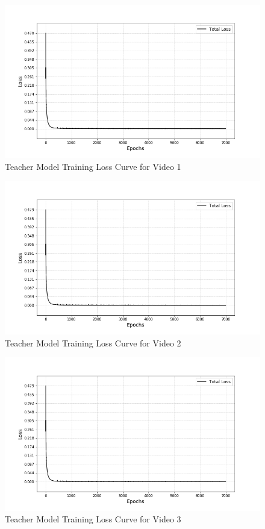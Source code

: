 \documentclass{ioereport}
\begin{document}
\begin{figure}[H]
    \centering
    \includegraphics[height=0.6\linewidth]{assets/audio_video_loss_curves/video1_loss.png}
    \caption{Teacher Model Training Loss Curve for Video 1}
    \label{fig:video-loss-curve-1}
\end{figure}

\begin{figure}[H]
    \centering
    \includegraphics[height=0.6\linewidth]{assets/audio_video_loss_curves/video1_loss.png}
    \caption{Teacher Model Training Loss Curve for Video 2}
    \label{fig:video-loss-curve-2}
\end{figure}

\begin{figure}[H]
    \centering
    \includegraphics[height=0.6\linewidth]{assets/audio_video_loss_curves/video1_loss.png}
    \caption{Teacher Model Training Loss Curve for Video 3}
    \label{fig:video-loss-curve-3}
\end{figure}
\end{document}
